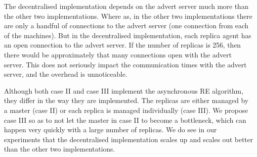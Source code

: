 \documentclass{rspublic}
\begin{document}



The decentralised implementation depends on the advert server much more than the other two implementations. Where as, in the other two implementations there are only a handful of connections to the advert server (one connection from each of the machines). But in the decentralised implementation, each replica agent has an open connection to the advert server. If the number of replicas is 256, then there would be approximately that many connections open with the advert server. This does not seriously impact the communication times with the advert server, and the overhead is unnoticeable.

Although both case II and case III implement the asynchronous RE algorithm, they differ in the way they are implemented. The replicas are either managed by a master (case II) or each replica is managed individually (case III). We propose case III so as to not let the master in case II to become a bottleneck, which can happen very quickly with a large number of replicas. We do see in our experiments that the decentralised implementation scales up and scales out better than the other two implementations.

\end{document}
